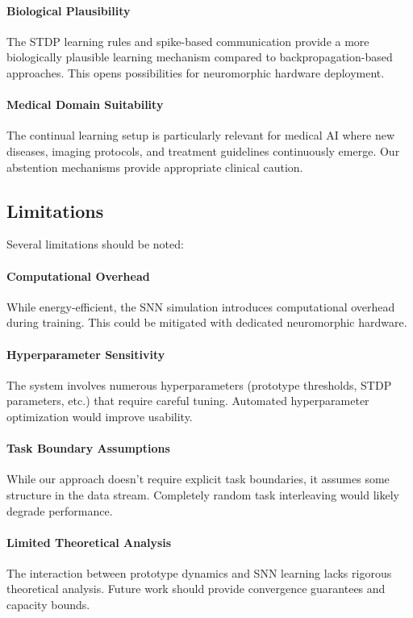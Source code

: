 \documentclass{article}
\begin{document}
\paragraph{Biological Plausibility} The STDP learning rules and spike-based communication provide a more biologically plausible learning mechanism compared to backpropagation-based approaches. This opens possibilities for neuromorphic hardware deployment.

\paragraph{Medical Domain Suitability} The continual learning setup is particularly relevant for medical AI where new diseases, imaging protocols, and treatment guidelines continuously emerge. Our abstention mechanisms provide appropriate clinical caution.

\subsection{Limitations}

Several limitations should be noted:

\paragraph{Computational Overhead} While energy-efficient, the SNN simulation introduces computational overhead during training. This could be mitigated with dedicated neuromorphic hardware.

\paragraph{Hyperparameter Sensitivity} The system involves numerous hyperparameters (prototype thresholds, STDP parameters, etc.) that require careful tuning. Automated hyperparameter optimization would improve usability.

\paragraph{Task Boundary Assumptions} While our approach doesn't require explicit task boundaries, it assumes some structure in the data stream. Completely random task interleaving would likely degrade performance.

\paragraph{Limited Theoretical Analysis} The interaction between prototype dynamics and SNN learning lacks rigorous theoretical analysis. Future work should provide convergence guarantees and capacity bounds.
\end{document}
